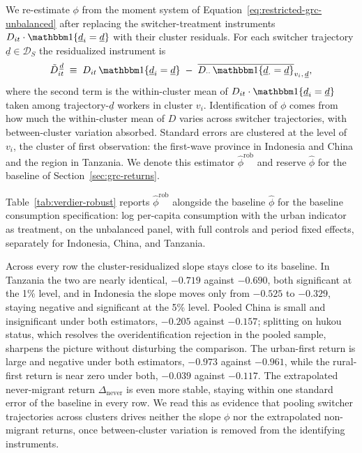 We re-estimate $\phi$ from the moment system of Equation~\eqref{eq:restricted-grc-unbalanced} after replacing the switcher-treatment instruments $D_{it}\cdot\mathbbm 1\{\underline d_i = \underline d\}$ with their cluster residuals.
For each switcher trajectory $\underline d \in \mathcal D_S$ the residualized instrument is
\begin{equation}\label{eq:residualized-instrument}
\tilde D_{it}^{\,\underline d} \;\equiv\; D_{it}\,\mathbbm 1\{\underline d_i=\underline d\} \;-\; \overline{D_{\cdot\cdot}\,\mathbbm 1\{\underline d_{\cdot}=\underline d\}}_{v_i,\,\underline d},
\end{equation}
where the second term is the within-cluster mean of $D_{it}\cdot\mathbbm 1\{\underline d_i=\underline d\}$ taken among trajectory-$\underline d$ workers in cluster $v_i$.
Identification of $\phi$ comes from how much the within-cluster mean of $D$ varies across switcher trajectories, with between-cluster variation absorbed.
Standard errors are clustered at the level of $v_i$, the cluster of first observation: the first-wave province in Indonesia and China and the region in Tanzania.
We denote this estimator $\hat\phi^{\mathrm{rob}}$ and reserve $\hat\phi$ for the baseline of Section~\ref{sec:grc-returns}.

Table~\ref{tab:verdier-robust} reports $\hat\phi^{\mathrm{rob}}$ alongside the baseline $\hat\phi$ for the baseline consumption specification: log per-capita consumption with the urban indicator as treatment, on the unbalanced panel, with full controls and period fixed effects, separately for Indonesia, China, and Tanzania.



Across every row the cluster-residualized slope stays close to its baseline.
In Tanzania the two are nearly identical, $-0.719$ against $-0.690$, both significant at the 1\% level, and in Indonesia the slope moves only from $-0.525$ to $-0.329$, staying negative and significant at the 5\% level.
Pooled China is small and insignificant under both estimators, $-0.205$ against $-0.157$; splitting on hukou status, which resolves the overidentification rejection in the pooled sample, sharpens the picture without disturbing the comparison.
The urban-first return is large and negative under both estimators, $-0.973$ against $-0.961$, while the rural-first return is near zero under both, $-0.039$ against $-0.117$.
The extrapolated never-migrant return $\Delta_{\text{never}}$ is even more stable, staying within one standard error of the baseline in every row.
We read this as evidence that pooling switcher trajectories across clusters drives neither the slope $\phi$ nor the extrapolated non-migrant returns, once between-cluster variation is removed from the identifying instruments.

